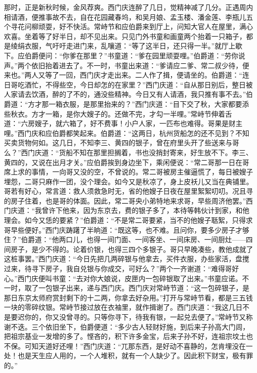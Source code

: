 那时，正是新秋时候，金风荐爽。西门庆连醉了几日，觉精神减了几分。正遇周内相请酒，便推事故不去，自在花园藏春坞，和吴月娘、孟玉楼、潘金莲、李瓶儿五个寻花问柳顽耍，好不快活。常峙节和应伯爵来到厅上，问知大官人在屋里，满心欢喜。坐着等了好半日，却不见出来。只见门外书童和画童两个抬着一只箱子，都是绫绢衣服，气吁吁走进门来，乱嚷道：“等了这半日，还只得一半。”就厅上歇下。应伯爵便问：“你爹在那里？”书童道：“爹在园里顽耍哩。”伯爵道：“劳你说声。”两个依旧抬着进去了。不一时，书童出来道：“爹请应二爹、常二叔少待，便来也。”两人又等了一回，西门庆才走出来。二人作了揖，便请坐的。伯爵道：“连日哥吃酒忙，不得些空，今日却怎的在家里？”西门庆道：“自从那日别后，整日被人家请去饮酒，醉的了不的，通没些精神。今日又有人请酒，我只推有事不去。”伯爵道：“方才那一箱衣服，是那里抬来的？”西门庆道：“目下交了秋，大家都要添些秋衣。方才一箱，是你大嫂子的。还做不完，才勾一半哩。”常峙节伸着舌道：“六房嫂子，就六箱了，好不费事！小户人家，一匹布也难得。哥果是财主哩。”西门庆和应伯爵都笑起来。伯爵道：“这两日，杭州货船怎的还不见到？不知买卖货物何如。这几日，不知李三、黄四的银子，曾在府里头开了些送来与哥么？”西门庆道：“货船不知在那里担搁着，书也没捎封寄来，好生放不下。李三、黄四的，又说在出月才关。”应伯爵挨到身边坐下，乘闲便说：“常二哥那一日在哥席上求的事情，一向哥又没的空，不曾说的。常二哥被房主催逼慌了，每日被嫂子埋怨，二哥只麻作一团，没个理会。如今又是秋凉了，身上皮袄儿又当在典铺里。哥若有好心，常言道：救人须救急时无，省的他嫂子日夜在屋里絮絮叨叨。况且寻的房子住着，也是哥的体面。因此，常二哥央小弟特地来求哥，早些周济他罢。”西门庆道：“我曾许下他来，因为东京去，费的银子多了，本待等韩伙计到家，和他理会。如今又恁的要紧？”伯爵道：“不是常二哥要紧，当不的他嫂子聒絮，只得求哥早些便好。”西门庆踌躇了半晌道：“既这等，也不难。且问你，要多少房子才够住？”伯爵道：“他两口儿，也得一间门面、一间客坐、一间床房、一间厨灶——四间房子，是少不得的。论着价银，也得三四个多银子。哥只早晚凑些，教他成就了这桩事罢。”西门庆道：“今日先把几两碎银与他拿去，买件衣服，办些家活，盘搅过来，待寻下房子，我自兑银与你成交，可好么？”两个一齐谢道：“难得哥好心。”西门庆便叫书童：“去对你大娘说，皮匣内一包碎银取了出来。”书童应诺。不一时，取了一包银子出来，递与西门庆。西门庆对常峙节道：“这一包碎银子，是那日东京太师府赏封剩下的十二两，你拿去好杂用。”打开与常峙节看，都是三五钱一块的零碎纹银。常峙节接过放在衣袖里，就作揖谢了。西门庆道：“我这几日不是要迟你的，你又没曾寻的。只等你寻下，待我有银，一起兑去便了。”常峙节又称谢不迭。三个依旧坐下，伯爵便道：“多少古人轻财好施，到后来子孙高大门闾，把祖宗基业一发增的多了。悭吝的，积下许多金宝，后来子孙不好，连祖宗坟土也不保。可知天道好还哩！”西门庆道：“兀那东西，是好动不喜静的，怎肯埋没在一处！也是天生应人用的，一个人堆积，就有一个人缺少了。因此积下财宝，极有罪的。”

